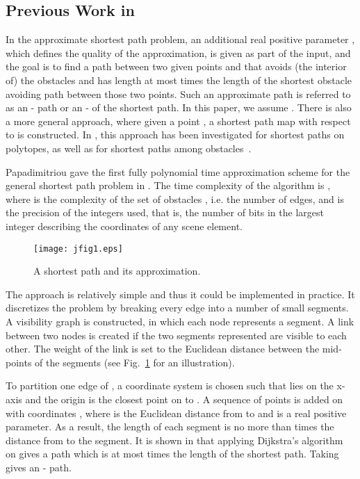 \documentclass{llncs}
\begin{document}
\subsection{Previous Work in }
\label{prev}


In the approximate shortest path problem, an additional real positive parameter , which defines the quality of the approximation, is given as part of
the input, and the goal is to find a path between two given points  and 
that avoids (the interior of)
the obstacles and has length at most  times the length of the shortest obstacle avoiding
path between those two points. Such an approximate path is referred to as an -
path or an - of the shortest path. In this paper, we assume
.
There is also a more general approach, where given a point , a shortest path map with respect to 
is constructed. In , this approach has been investigated for shortest paths on polytopes,
as well as for shortest paths among obstacles~\cite{Sar99}.

Papadimitriou \cite{Pap85} gave the first fully polynomial time approximation scheme for the general shortest
path problem in .
The time complexity of the algorithm is ,
where  is the complexity of the set of obstacles , i.e. the number of edges, and  is the precision of the
integers used, that is, the number of bits in the largest integer describing the coordinates of
any scene element.

\begin{figure}\begin{center}
    \leavevmode
\texttt{[image: jfig1.eps]}
    \caption{A shortest path and its approximation.}
    \label{jfig1}
    \end{center}
    \vspace{-0.15in}
\end{figure}

The approach is relatively simple and thus it could be implemented in practice. It discretizes the
problem by breaking every edge into a number of small segments. A visibility graph  is constructed,
in which each node represents a segment. A link between two nodes is created if the two segments
represented are visible to each other. The weight of the link is set to the Euclidean distance between
the mid-points of the segments (see Fig.~\ref{jfig1} for an illustration).



To partition one edge  of , a coordinate system is chosen such that  lies on the x-axis and the
origin is the closest point on  to . A sequence of points is added on  with coordinates
, where  is the Euclidean distance from
 to  and  is a real positive parameter. As a result, the length of each segment is
no more than  times the distance from  to the segment. It is shown in \cite{Pap85}
that applying Dijkstra's algorithm on  gives a path which is at most  times the
length of the shortest path. Taking  gives an - path.
\end{document}
